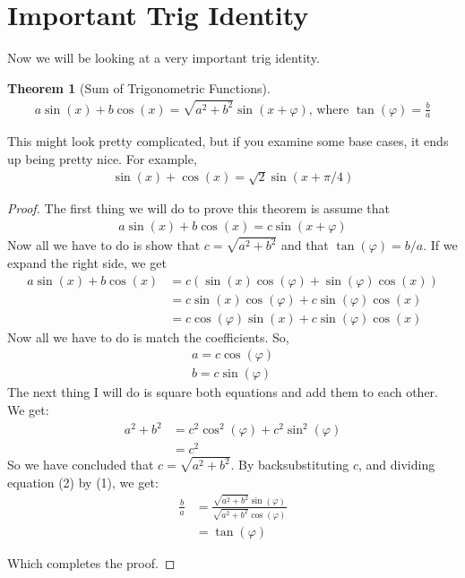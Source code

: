 \documentclass[12pt]{article}
\newtheorem{theorem}{Theorem}[section]
\theoremstyle{definition}
\theoremstyle{remark}
\begin{document}
    \section{Important Trig Identity}
    Now we will be looking at a very important trig identity.
    \begin{theorem}[Sum of Trigonometric Functions]\label{sum of trig functions}
        \begin{align*}
            a\sin(x)+b\cos(x) = \sqrt{a^2+b^2}\sin(x+\varphi) \text{, where } \tan(\varphi) = \frac{b}{a}
        \end{align*}
    \end{theorem}
    This might look pretty complicated, but if you examine some base cases, it ends up being pretty nice. For example,
    \begin{align*}
        \sin(x)+\cos(x) = \sqrt{2}\sin(x+\pi/4)
    \end{align*}
    \begin{proof}
        The first thing we will do to prove this theorem is assume that
        \begin{align*}
            a\sin(x)+b\cos(x) = c\sin(x+\varphi)
        \end{align*}
        Now all we have to do is show that $c = \sqrt{a^2+b^2}$ and that $\tan(\varphi) = b/a$.
        If we expand the right side, we get 
        \begin{align*}
            a\sin(x)+b\cos(x) &= c(\sin(x)\cos(\varphi) + \sin(\varphi)\cos(x)) \\ 
            &= c\sin(x)\cos(\varphi) + c\sin(\varphi)\cos(x) \\ 
            &= c\cos(\varphi)\sin(x) + c\sin(\varphi)\cos(x)
        \end{align*}
        Now all we have to do is match the coefficients.
        So,
        \begin{align}
            a = c\cos(\varphi) \\ 
            b = c\sin(\varphi)
        \end{align}
        The next thing I will do is square both equations and add them to each other. We get: 
        \begin{align*}
            a^2 + b^2 &= c^2\cos^2(\varphi) + c^2\sin^2(\varphi) \\ 
            &= c^2
        \end{align*}
        So we have concluded that $c = \sqrt{a^2+b^2}$. 
        By backsubstituting $c$, and dividing equation (2) by (1), we get:
        \begin{align*}
            \frac{b}{a} &= \frac{\sqrt{a^2+b^2}\sin(\varphi)}{\sqrt{a^2+b^2}\cos(\varphi)} \\ 
            &= \tan(\varphi)
        \end{align*}

        Which completes the proof.
    \end{proof}
\end{document}

